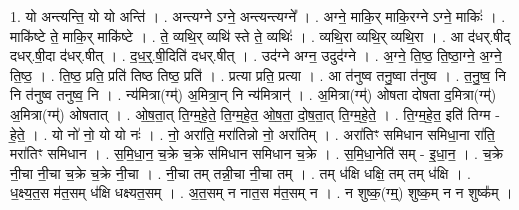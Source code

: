 \documentclass[17pt]{extarticle}
\begin{document}
1. यो अन्त्यन्ति॒ यो यो अन्ति॑ । . अन्त्यग्ने ऽग्ने॒ अन्त्यन्त्यग्ने᳚ । . अग्ने॒ माकि॒र् माकि॒रग्ने ऽग्ने॒ माकिः॑ । . माकि॑ष्टे ते॒ माकि॒र् माकि॑ष्टे । . ते॒ व्यथि॒र् व्यथि॑ स्ते ते॒ व्यथिः॑ । . व्यथि॒रा व्यथि॒र् व्यथि॒रा । . आ द॑धर्.षीद् दधर्.षी॒दा द॑धर्.षीत् । . द॒ध॒र्॒.षी॒दिति॑ दधर्.षीत् । . उद॑ग्ने अग्न॒ उदुद॑ग्ने । . अ॒ग्ने॒ ति॒ष्ठ॒ ति॒ष्ठा॒ग्ने॒ अ॒ग्ने॒ ति॒ष्ठ॒ । . ति॒ष्ठ॒ प्रति॒ प्रति॑ तिष्ठ तिष्ठ॒ प्रति॑ । . प्रत्या प्रति॒ प्रत्या । . आ त॑नुष्व तनु॒ष्वा त॑नुष्व । . त॒नु॒ष्व॒ नि नि त॑नुष्व तनुष्व॒ नि । . न्य॑मित्रा(ग्म्॑) अ॒मित्रा॒न् नि न्य॑मित्रान्॑ । . अ॒मित्रा(ग्म्॑) ओषता दोषता द॒मित्रा(ग्म्॑) अ॒मित्रा(ग्म्॑) ओषतात् । . ओ॒ष॒ता॒त् ति॒ग्म॒हे॒ते॒ ति॒ग्म॒हे॒त॒ ओ॒ष॒ता॒ दो॒ष॒ता॒त् ति॒ग्म॒हे॒ते॒ । . ति॒ग्म॒हे॒त॒ इति॑ तिग्म - हे॒ते॒ । . यो नो॑ नो॒ यो यो नः॑ । . नो॒ अरा॑ति॒ मरा॑तिन्नो नो॒ अरा॑तिम् । . अरा॑तिꣳ समिधान समिधा॒ना रा॑ति॒ मरा॑तिꣳ समिधान । . स॒मि॒धा॒न॒ च॒क्रे च॒क्रे स॑मिधान समिधान च॒क्रे । . स॒मि॒धा॒नेति॑ सम् - इ॒धा॒न॒ । . च॒क्रे नी॒चा नी॒चा च॒क्रे च॒क्रे नी॒चा । . नी॒चा तम् तन्नी॒चा नी॒चा तम् । . तम् ध॑क्षि धक्षि॒ तम् तम् ध॑क्षि । . ध॒क्ष्य॒त॒स म॑त॒सम् ध॑क्षि धक्ष्यत॒सम् । . अ॒त॒सम् न नात॒स म॑त॒सम् न । . न शुष्क॒(ग्म्॒) शुष्क॒म् न न शुष्क᳚म् । \newline
\end{document}
